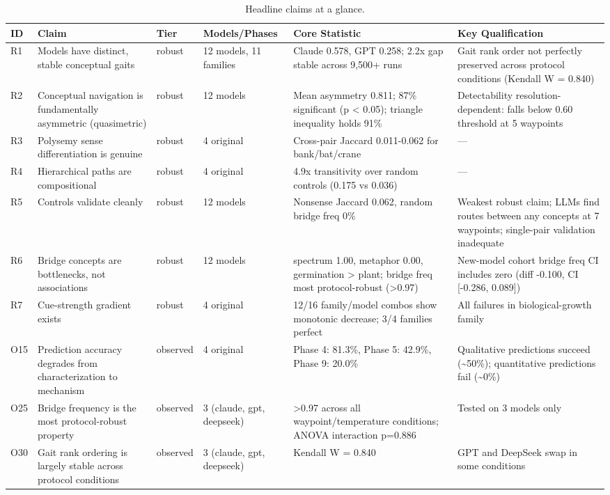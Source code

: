 \begin{table}[t]
\centering
\caption{Headline claims at a glance.}
\label{tab:claims}
\small
\begin{tabular}{l p{3.0cm} l l p{4.5cm} p{4.5cm}}
\toprule
ID & Claim & Tier & Models/Phases & Core Statistic & Key Qualification \\
\midrule
    R1 & Models have distinct, stable conceptual gaits & robust & 12 models, 11 families & Claude 0.578, GPT 0.258; 2.2x gap stable across 9,500+ runs & Gait rank order not perfectly preserved across protocol conditions (Kendall W = 0.840) \\
    R2 & Conceptual navigation is fundamentally asymmetric (quasimetric) & robust & 12 models & Mean asymmetry 0.811; 87\% significant (p < 0.05); triangle inequality holds 91\% & Detectability resolution-dependent: falls below 0.60 threshold at 5 waypoints \\
    R3 & Polysemy sense differentiation is genuine & robust & 4 original & Cross-pair Jaccard 0.011-0.062 for bank/bat/crane & --- \\
    R4 & Hierarchical paths are compositional & robust & 4 original & 4.9x transitivity over random controls (0.175 vs 0.036) & --- \\
    R5 & Controls validate cleanly & robust & 12 models & Nonsense Jaccard 0.062, random bridge freq 0\% & Weakest robust claim; LLMs find routes between any concepts at 7 waypoints; single-pair validation inadequate \\
    R6 & Bridge concepts are bottlenecks, not associations & robust & 12 models & spectrum 1.00, metaphor 0.00, germination > plant; bridge freq most protocol-robust (>0.97) & New-model cohort bridge freq CI includes zero (diff -0.100, CI [-0.286, 0.089]) \\
    R7 & Cue-strength gradient exists & robust & 4 original & 12/16 family/model combos show monotonic decrease; 3/4 families perfect & All failures in biological-growth family \\
    O15 & Prediction accuracy degrades from characterization to mechanism & observed & 4 original & Phase 4: 81.3\%, Phase 5: 42.9\%, Phase 9: 20.0\% & Qualitative predictions succeed (\textasciitilde{}50\%); quantitative predictions fail (\textasciitilde{}0\%) \\
    O25 & Bridge frequency is the most protocol-robust property & observed & 3 (claude, gpt, deepseek) & >0.97 across all waypoint/temperature conditions; ANOVA interaction p=0.886 & Tested on 3 models only \\
    O30 & Gait rank ordering is largely stable across protocol conditions & observed & 3 (claude, gpt, deepseek) & Kendall W = 0.840 & GPT and DeepSeek swap in some conditions \\
\bottomrule
\end{tabular}
\end{table}
